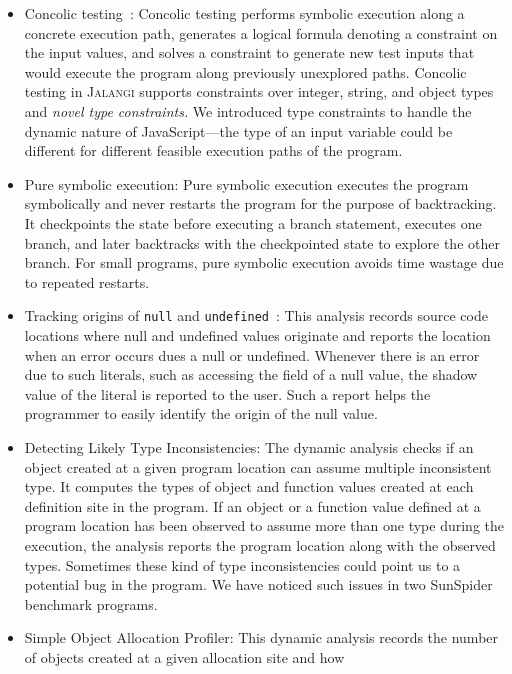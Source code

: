 \documentclass{sig-alternate}
\def\jalangi{\textsc{Jalangi}}
\begin{document}
\begin{itemize}
\item Concolic testing~\cite{dart,cute}: Concolic testing performs
  symbolic execution along a concrete execution path, generates a
  logical formula denoting a constraint on the input values, and
  solves a constraint to generate new test inputs that would execute
  the program along previously unexplored paths.  Concolic testing in
  \jalangi{} supports constraints over integer, string, and object
  types and \emph{novel type constraints.}  We introduced type
  constraints to handle the dynamic nature of JavaScript---the type of
  an input variable could be different for different feasible
  execution paths of the program.
\item Pure symbolic execution: Pure symbolic execution executes the
  program symbolically and never restarts the program for the purpose
  of backtracking.  It checkpoints the state before executing a branch
  statement, executes one branch, and later backtracks with the
  checkpointed state to explore the other branch.  For small programs,
  pure symbolic execution avoids time wastage due to repeated
  restarts.
\item Tracking origins of \texttt{null} and
  \texttt{undefined}~\cite{Bond:2007:TBA:1297027.1297057}: This
  analysis records source code locations where null and undefined
  values originate and reports the location when an error occurs dues
  a null or undefined.  Whenever there is an error due to such
  literals, such as accessing the field of a null value, the shadow
  value of the literal is reported to the user.  Such a report helps
  the programmer to easily identify the origin of the null value.
\item Detecting Likely Type Inconsistencies: The dynamic analysis
  checks if an object created at a given program location can assume
  multiple inconsistent type.  It computes the types of object and
  function values created at each definition site in the program.  If
  an object or a function value defined at a program location has been
  observed to assume more than one type during the execution, the
  analysis reports the program location along with the observed types.
  Sometimes these kind of type inconsistencies could point us to a
  potential bug in the program.  We have noticed such issues in two
  SunSpider benchmark programs.
\item Simple Object Allocation Profiler: This dynamic analysis records
  the number of objects created at a given allocation site and how

\end{itemize}
\end{document}
